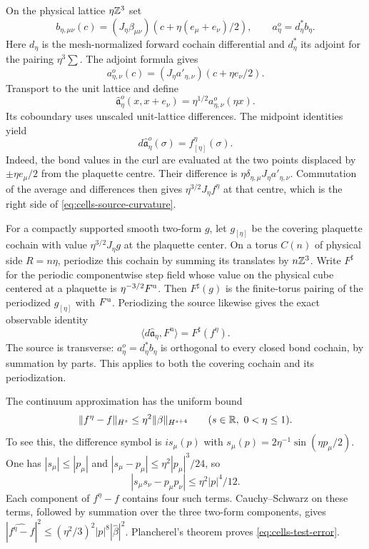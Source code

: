 On the physical lattice $\eta\mathbb Z^3$ set
\[
 b_{\eta,\mu\nu}(c)
       =(J_\eta\beta_{\mu\nu})
                       (c+\eta(e_\mu+e_\nu)/2),\qquad
 a_\eta^o=d_\eta^*b_\eta.
\]
Here $d_\eta$ is the mesh-normalized forward cochain differential
and $d_\eta^*$ its adjoint for the pairing $\eta^3\sum$.
The adjoint formula gives
\begin{equation}\label{eq:cells-midpoint-source}
 a_{\eta,\nu}^o(c)=(J_\eta a'_{\eta,\nu})(c+\eta e_\nu/2).
\end{equation}
Transport to the unit lattice and define
\[
 \hat{\mathfrak a}_\eta^o(x,x+e_\nu)
                    =\eta^{1/2}a_{\eta,\nu}^o(\eta x).
\]
Its coboundary uses unscaled unit-lattice differences. The
midpoint identities yield
\begin{equation}\label{eq:cells-source-curvature}
 d\hat{\mathfrak a}_\eta^o(\sigma)
                        =f^\eta_{[\eta]}(\sigma).
\end{equation}
Indeed, the bond values in the curl are evaluated at the two
points displaced by $\pm\eta e_\mu/2$ from the plaquette centre.
Their difference is $\eta\delta_{\eta,\mu}J_\eta a'_{\eta,\nu}$.
Commutation of the average and differences then gives
$\eta^{3/2}J_\eta f^\eta$ at that centre, which is the right
side of \eqref{eq:cells-source-curvature}.

For a compactly supported smooth two-form $g$, let $g_{[\eta]}$
be the covering plaquette cochain with value $\eta^{3/2}J_\eta g$
at the plaquette center. On a torus $C(n)$ of physical side
$R=n\eta$, periodize this cochain by summing its translates by
$n\mathbb Z^3$. Write $F^\sharp$ for the periodic componentwise step
field whose value on the physical cube centered at a plaquette
is $\eta^{-3/2}F^{\rm u}$. Then $F^\sharp(g)$ is the finite-torus
pairing of the periodized $g_{[\eta]}$ with $F^{\rm u}$.
Periodizing the source likewise gives the exact observable identity
\begin{equation}\label{eq:cells-observable}
 \langle d\hat{\mathfrak a}_\eta,F^{\mathrm u}\rangle
                            =F^\sharp(f^\eta).
\end{equation}
The source is transverse: $a_\eta^o=d_\eta^*b_\eta$ is
orthogonal to every closed bond cochain, by summation by
parts. This applies to both the covering cochain and its
periodization.

The continuum approximation has the uniform bound
\begin{equation}\label{eq:cells-test-error}
 \|f^\eta-f\|_{H^s}\le\eta^2\|\beta\|_{H^{s+4}}
                         \qquad(s\in\mathbb R,\ 0<\eta\le1).
\end{equation}
To see this, the difference symbol is
$is_\mu(p)$ with $s_\mu(p)=2\eta^{-1}\sin(\eta p_\mu/2)$.
One has $|s_\mu|\le|p_\mu|$ and
$|s_\mu-p_\mu|\le\eta^2|p_\mu|^3/24$, so
\[
 |s_\mu s_\nu-p_\mu p_\nu|
                               \le\eta^2|p|^4/12.
\]
Each component of $f^\eta-f$ contains four such terms.
Cauchy--Schwarz on these terms, followed by summation over
the three two-form components, gives
$|\widehat{f^\eta-f}|^2\le(\eta^2/3)^2|p|^8|\hat\beta|^2$.
Plancherel's theorem proves \eqref{eq:cells-test-error}.

